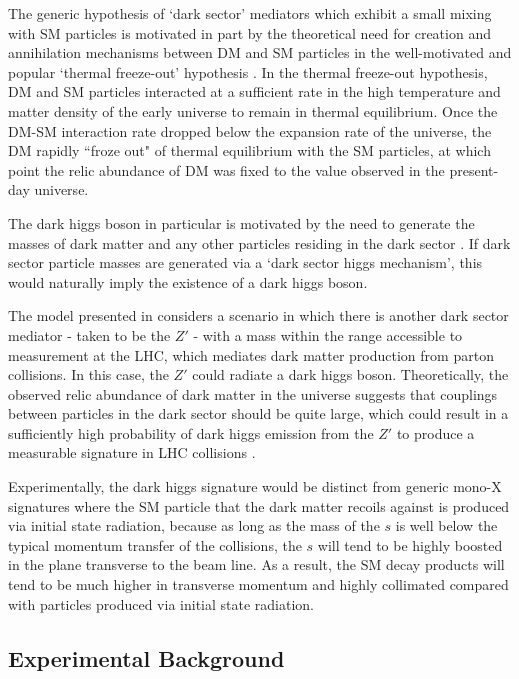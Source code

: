\documentclass[12pt]{article}
\begin{document}
The generic hypothesis of `dark sector' mediators which exhibit a small mixing with SM particles is motivated in part by the theoretical need for creation and annihilation mechanisms between DM and SM particles in the well-motivated and popular `thermal freeze-out' hypothesis \cite{particle_dm}. In the thermal freeze-out hypothesis, DM and SM particles interacted at a sufficient rate in the high temperature and matter density of the early universe to remain in thermal equilibrium. Once the DM-SM interaction rate dropped below the expansion rate of the universe, the DM rapidly ``froze out" of thermal equilibrium with the SM particles, at which point the relic abundance of DM was fixed to the value observed in the present-day universe.

The dark higgs boson in particular is motivated by the need to generate the masses of dark matter and any other particles residing in the dark sector \cite{dark_higgs}. If dark sector particle masses are generated via a `dark sector higgs mechanism', this would naturally imply the existence of a dark higgs boson. 

The model presented in \cite{dark_higgs} considers a scenario in which there is another dark sector mediator - taken to be the $Z'$ - with a mass within the range accessible to measurement at the LHC, which mediates dark matter production from parton collisions. In this case, the $Z'$ could radiate a dark higgs boson. Theoretically, the observed relic abundance of dark matter in the universe suggests that couplings between particles in the dark sector should be quite large, which could result in a sufficiently high probability of dark higgs emission from the $Z'$ to produce a measurable signature in LHC collisions \cite{dark_higgs}. 

Experimentally, the dark higgs signature would be distinct from generic mono-X signatures where the SM particle that the dark matter recoils against is produced via initial state radiation, because as long as the mass of the $s$ is well below the typical momentum transfer of the collisions, the $s$ will tend to be highly boosted in the plane transverse to the beam line. As a result, the SM decay products will tend to be much higher in transverse momentum and highly collimated compared with particles produced via initial state radiation.  

\subsection{Experimental Background}
\end{document}
